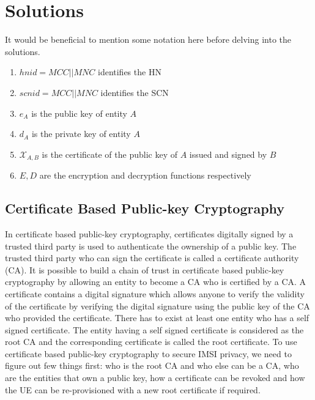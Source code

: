 \documentclass[lnicst,sechang,a4paper]{svmultln}
\begin{document}
\section{Solutions}\label{sec:solutions} 
\label{sec:solutions}
It would be beneficial to mention some notation here before delving into the solutions. 
\begin{enumerate}
\item $hnid=MCC||MNC$ identifies the HN
\item $scnid=MCC||MNC$ identifies the SCN
\item $e_A$ is the public key of entity $A$
\item $d_A$ is the private key of entity $A$ 
\item $\mathcal{X}_{A,B}$ is the certificate of the public key of $A$ issued and signed by $B$
\item $E,D$ are the encryption and decryption functions respectively
\end{enumerate}


\subsection{Certificate Based Public-key Cryptography} 
\label{sub_sec:solution_certificate}
In certificate based public-key cryptography, certificates digitally signed by a trusted third party is used to authenticate the ownership of a public key. The trusted third party who can sign the certificate is called a certificate authority (CA). It is possible to build a chain of trust in certificate based public-key cryptography by allowing an entity to become a CA who is certified by a CA. A certificate contains a digital signature which allows anyone to verify the validity of the certificate by verifying the digital signature using the public key of the CA who provided the certificate. There has to exist at least one entity who has a self signed certificate. The entity having a self signed certificate is considered as the root CA and the corresponding certificate is called the root certificate. To use certificate based public-key cryptography to secure IMSI privacy, we need to figure out few things first: who is the root CA and who else can be a CA, who are the entities that own a public key,  how a certificate can be revoked and how the UE can be re-provisioned with a new root certificate if required.
\end{document}
